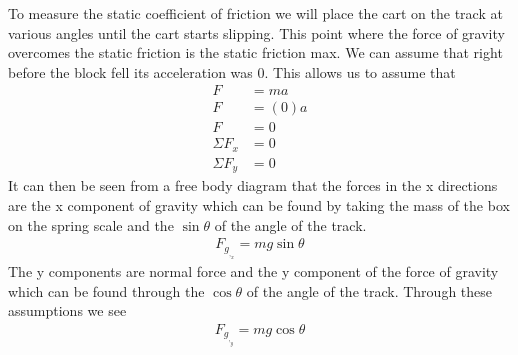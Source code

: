 \documentclass{article}
\begin{document}
    To measure the static coefficient of friction we will place the cart on the track at various angles until the cart starts slipping. This point where the force of gravity overcomes the static friction is the static friction max. We can assume that right before the block fell its acceleration was 0. This allows us to assume that 
    \begin{align*}
        F &= ma\\
        F &= (0)a\\
        F &= 0\\
        \Sigma{}F_x &= 0\\
        \Sigma{}F_y &= 0
    \end{align*}
    It can then be seen from a free body diagram that the forces in the x directions are the x component of gravity which can be found by taking the mass of the box on the spring scale and the $\sin\theta$ of the angle of the track.
    \begin{align*}
        F_g_,_x = mg\sin\theta
    \end{align*}
    The y components are normal force and the y component of the force of gravity which can be found through the $\cos\theta$ of the angle of the track. Through these assumptions we see
    \begin{align*}
        F_g_,_y = mg\cos\theta 
    \end{align*}
    
\end{document}
